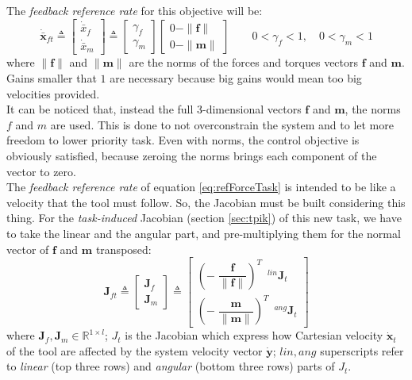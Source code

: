 \noindent The \textit{feedback reference rate} for this objective will be:
\begin{equation}
	\label{eq:refForceTask}
	\boldsymbol{\dot{\bar{x}}}_{ft} \triangleq \begin{bmatrix}{\dot{\bar{x}}}_f \\ {\dot{\bar{x}}}_m \end{bmatrix} \triangleq 
	\begin{bmatrix} \gamma_f \\ \gamma_m \end{bmatrix} 
	\begin{bmatrix}
		0 - \| \boldsymbol{f} \| \\ 0 -\| \boldsymbol{m} \|
	\end{bmatrix} \qquad 0 < \gamma_f < 1, \quad 0 < \gamma_m < 1
\end{equation}
where $\| \boldsymbol{f} \|$ and $\| \boldsymbol{m} \|$ are the norms of the forces and torques vectors $\boldsymbol{f}$ and $\boldsymbol{m}$. Gains smaller that $1$ are necessary because big gains would mean too big velocities provided.\\
It can be noticed that, instead the full 3-dimensional vectors $\boldsymbol{f}$ and $\boldsymbol{m}$, the norms $f$ and $m$ are used. This is done to not overconstrain the system and to let more freedom to lower priority task. Even with norms, the control objective is obviously satisfied, because zeroing the norms brings each component of the vector to zero.\\

The \textit{feedback reference rate} of equation \eqref{eq:refForceTask} is intended to be like a velocity that the tool must follow. So, the Jacobian must be built considering this thing. For the \textit{task-induced} Jacobian (section \ref{sec:tpik}) of this new task, we have to take the linear and the angular part, and pre-multiplying them for the normal vector of $\boldsymbol{f}$ and $\boldsymbol{m}$ transposed:
\begin{equation}
	\boldsymbol{J}_{ft} \triangleq \begin{bmatrix}{\boldsymbol{J}}_f \\[1em] {\boldsymbol{J}}_m \end{bmatrix} \triangleq 
	\begin{bmatrix} \left( - \; \dfrac{\boldsymbol{f}}{\| \boldsymbol{f} \|}\right)^T \enspace ^{lin}\boldsymbol{J}_t  \\[1.5em]
		\left( - \; \dfrac{\boldsymbol{m}}{\| \boldsymbol{m} \|}\right) ^T \enspace ^{ang}\boldsymbol{J}_t  \end{bmatrix} 
\end{equation}
where $\boldsymbol{J}_f, \boldsymbol{J}_m \in \mathbb{R}^{1\times l}$; $J_t$ is the Jacobian which express how Cartesian velocity $\dot{\boldsymbol{x}}_t$ of the tool are affected by the system velocity vector  $\dot{\boldsymbol{y}}$; $lin, ang$ superscripts refer to \textit{linear} (top three rows) and \textit{angular} (bottom three rows) parts of $J_t$.\\

